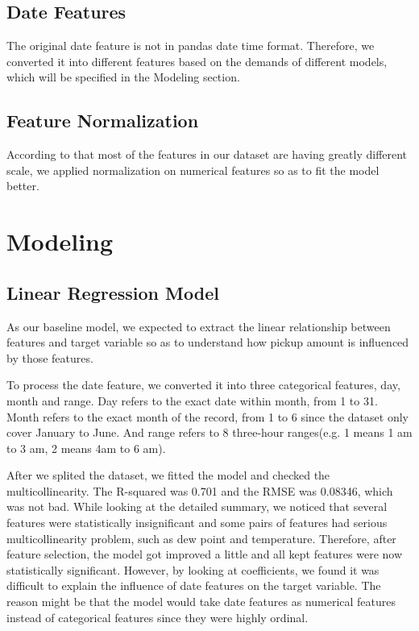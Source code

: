 \documentclass[article, 10 pt, conference]{ieeeconf}
\begin{document}
\subsection{Date Features}

The original date feature is not in pandas date time format. Therefore, we converted it into different features based on the demands of different models, which will be specified in the Modeling section.

\subsection{Feature Normalization}

According to that most of the features in our dataset are having greatly different scale, we applied normalization on numerical features so as to fit the model better.



\section{Modeling}

\subsection{Linear Regression Model}

As our baseline model, we expected to extract the linear relationship between features and target variable so as to understand how pickup amount is influenced by those features. 

To process the date feature, we converted it into three categorical features, day, month and range. Day refers to the exact date within month, from 1 to 31. Month refers to the exact month of the record, from 1 to 6 since the dataset only cover January to June. And range refers to 8 three-hour ranges(e.g. 1 means 1 am to 3 am, 2 means 4am to 6 am). 

After we splited the dataset, we fitted the model and checked the multicollinearity. The R-squared was 0.701 and the RMSE was 0.08346, which was not bad. While looking at the detailed summary, we noticed that several features were statistically insignificant and some pairs of features had serious multicollinearity problem, such as dew point and temperature. Therefore, after feature selection, the model got improved a little and all kept features were now statistically significant. However, by looking at coefficients, we found it was difficult to explain the influence of date features on the target variable. The reason might be that the model would take date features as numerical features instead of categorical features since they were highly ordinal.
\end{document}
